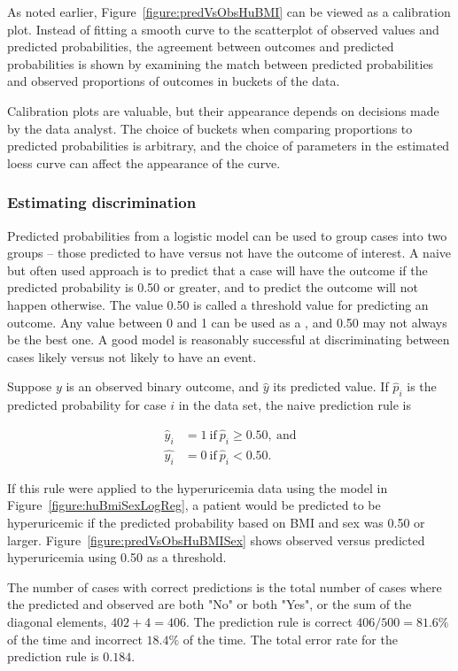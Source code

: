   As noted earlier, Figure~\ref{figure:predVsObsHuBMI} can be viewed as a calibration plot.  Instead of fitting a smooth curve to the scatterplot of observed values and predicted probabilities,  the agreement between outcomes and predicted probabilities is shown by examining the match between predicted probabilities and observed proportions of outcomes in buckets of the data.

  Calibration plots are valuable, but their appearance depends on decisions made by the data analyst.  The choice of buckets when comparing proportions to predicted probabilities is arbitrary, and the choice of parameters in the estimated loess curve can affect the appearance of the curve. 
   
\subsubsection{Estimating discrimination}

Predicted probabilities from a logistic model can be used to group cases into two groups -- those predicted to have versus not have the outcome of interest.  A naive but often used approach is to predict that a case will have the outcome if the predicted probability is 0.50 or greater, and to predict the outcome will not happen otherwise.  The value 0.50 is called a threshold value for predicting an outcome.  Any value between 0 and 1 can be used as a , and 0.50 may not always be the best one.  A good model is reasonably successful at discriminating between cases likely versus not likely to have an event.

Suppose $y$ is an observed binary outcome, and $\hat{y}$ its predicted value. If $\hat{p}_i$ is the predicted probability for case $i$ in the data set, the naive prediction rule is 

\begin{align*}
   \hat{y}_i &= 1 \  \text{if}\  \hat{p}_i \geq 0.50, \  \text{and}\\
   \hat{y_i} &= 0 \ \text{if}\  \hat{p}_i < 0.50.
\end{align*} 

If this rule were applied to the hyperuricemia data using the model in Figure~\ref{figure:huBmiSexLogReg}, a patient would be predicted to be hyperuricemic if the predicted probability based on BMI and sex was 0.50 or larger.  Figure~\ref{figure:predVsObsHuBMISex} shows observed versus predicted hyperuricemia using 0.50 as a threshold.  

The number of cases with correct predictions is the total number of cases where the predicted and observed are both "No" or both "Yes", or the sum of the diagonal elements, $402 + 4 = 406$.  The prediction rule is correct $406/500 = 81.6\%$ of the time and 
incorrect $18.4\%$ of the time.  The total error rate for the prediction rule is $0.184$.

